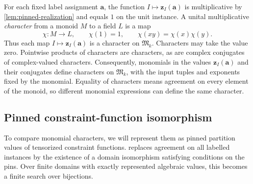 \documentclass[11pt,letterpaper,onecolumn]{article}
\theoremstyle{plain}
\theoremstyle{definition}
\theoremstyle{remark}
\newcommand{\zvec}[1]{\mathbf z_{#1}}
\newcommand{\InstMonoid}[1]{\mathfrak M_{#1}}
\begin{document}
For each fixed label assignment $\mathbf a$, the function
$I\mapsto\zvec I(\mathbf a)$ is multiplicative by
\cref{lem:pinned-realization} and equals $1$ on the unit instance.
A unital multiplicative \emph{character} from a monoid $M$ to a field $L$ is
a map
\[
  \chi:M\to L,
  \qquad
  \chi(1)=1,
  \qquad
  \chi(xy)=\chi(x)\chi(y).
\]
Thus each map $I\mapsto\zvec I(\mathbf a)$ is a character on
$\InstMonoid{k}$.  Characters may take the value zero.  Pointwise products
of characters are characters, as are complex conjugates of complex-valued
characters.  Consequently, monomials in the values $\zvec I(\mathbf a)$
and their conjugates define characters on $\InstMonoid{k}$, with the
input tuples and exponents fixed by the monomial.
Equality of characters means agreement on every element of the monoid,
so different monomial expressions can define the same character.

\subsection{Pinned constraint-function isomorphism}
\label{subsec:pinned-isomorphism}

To compare monomial characters, we will represent them as pinned partition
values of tensorized constraint functions.  
replaces agreement on all labelled instances by the existence of a domain
isomorphism satisfying conditions on the pins.  Over finite domains with
exactly represented algebraic values, this becomes a finite search over
bijections.
\end{document}
